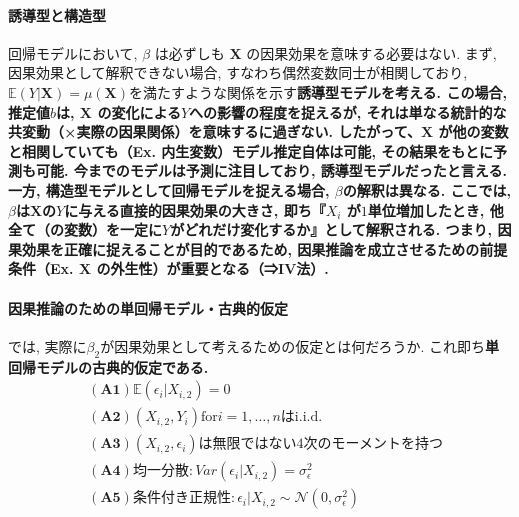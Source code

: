 \documentclass[paper=a4paper,fontsize=10pt]{jlreq}
\begin{document}
\paragraph{誘導型と構造型}
回帰モデルにおいて, $\beta$ は必ずしも $\mathbf{X}$ の因果効果を意味する必要はない. まず, 因果効果として解釈できない場合, すなわち偶然変数同士が相関しており, $\mathbb{E}(Y|\mathbf{X})=\mu(\mathbf{X})$を満たすような関係を示す\rmfamily\mcfamily\bfseries{誘導型モデル}\mdseries を考える. この場合, 推定値$b$は, $\mathbf{X}$ の変化による$Y$への影響の程度を捉えるが, それは単なる統計的な共変動（×実際の因果関係）を意味するに過ぎない. したがって、$\mathbf{X}$ が他の変数と相関していても（Ex. 内生変数）\rmfamily\mcfamily\bfseries{モデル推定自体は可能}\mdseries , その結果をもとに\rmfamily\mcfamily\bfseries{予測も可能}\mdseries . 今までのモデルは予測に注目しており, 誘導型モデルだったと言える. 一方, \rmfamily\mcfamily\bfseries{構造型モデル}\mdseries として回帰モデルを捉える場合, $\beta$の解釈は異なる. ここでは, $\beta$は$\mathbf{X}$の$Y$に与える\rmfamily\mcfamily\bfseries{直接的因果効果}\mdseries の大きさ, 即ち『$X_{i}$ が$1$単位増加したとき, 他全て（の変数）を一定に$Y$がどれだけ変化するか』として解釈される. つまり, 因果効果を正確に捉えることが目的であるため, 因果推論を成立させるための前提条件（Ex. $\mathbf{X}$ の外生性）が重要となる（⇒IV法）.\\

\paragraph{因果推論のための単回帰モデル・古典的仮定}
では, 実際に$\beta_2$が因果効果として考えるための仮定とは何だろうか. これ即ち\rmfamily\mcfamily\bfseries{単回帰モデルの古典的仮定}\mdseries である. 
\begin{align*}
  &\mathbf{(A1)}　 \mathbb{E}(\epsilon_i|X_{i, 2})=0\\
  &\mathbf{(A2)}　 (X_{i, 2}, Y_{i})　\text{for}　i=1, \dots, n　\text{はi.i.d.}\\
  &\mathbf{(A3)}　 (X_{i, 2}, \epsilon_{i})\text{は無限ではない4次のモーメントを持つ}\\
  &\mathbf{(A4)}　 \text{均一分散}: Var(\epsilon_i|X_{i, 2})=\sigma_\epsilon^{2}\\
  &\mathbf{(A5)}　 条件付き正規性: \epsilon_i|X_{i, 2} \sim \mathcal{N} (0, \sigma_\epsilon^{2})
\end{align*}
\end{document}
